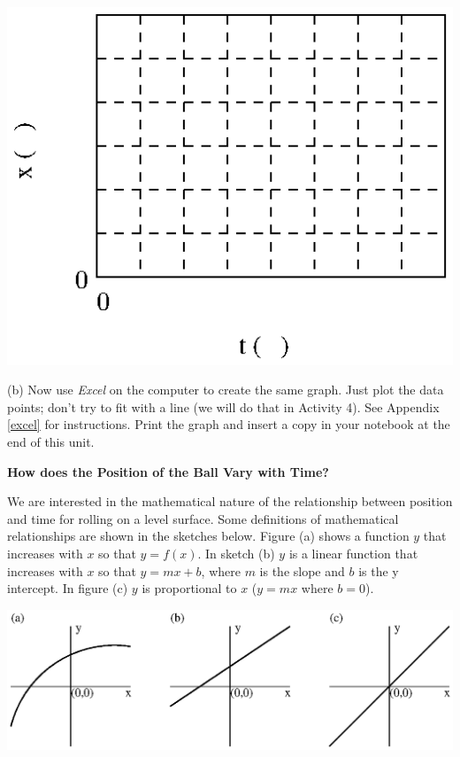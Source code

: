 \vspace{0.3cm}
{\par\centering \includegraphics{measuring/measuring_fig1.eps} \par}
\answerspace{0.6cm}

(b) Now use \textit{Excel} on the computer to create the same graph. Just plot the 
data points; don't try to fit with a line (we will do that in Activity 4). 
See Appendix \ref{excel} for instructions. Print the graph and insert a copy in your 
notebook at the end of this unit.

\textbf{How does the Position of the Ball Vary with Time?} 

We are interested in the mathematical nature of the relationship between position
and time for rolling on a level surface. Some definitions of mathematical relationships
are shown in the sketches below. Figure (a) shows a function $y$ that increases
with $x$ so that $y = f(x)$. 
In sketch (b) $y$ is a linear function that increases
with $x$ so that $y = mx + b$, where 
$m$ is the slope and $b$ is the y intercept. In
figure (c) $y$ is proportional to $x$ ($y = mx$ where $b = 0$).

\answerspace{0.3cm}
{\par\centering \includegraphics{measuring/measuring_fig2.eps} \par}
\answerspace{0.8cm}

